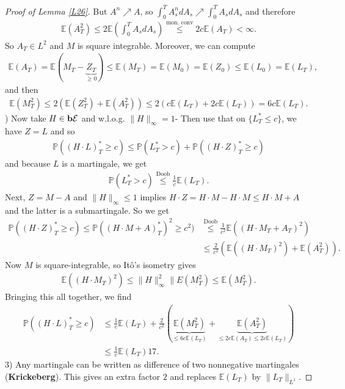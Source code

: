 \documentclass[12pt,a4paper, twoside]{article}
\theoremstyle{definition}
\newcommand{\EE}{\mathbb{E}} %
\newcommand{\PP}{\mathbb{P}} %
\newcommand{\simple}{\textbf{\text{b}}\mathcal{E}}
\begin{document}
\begin{proof}[Proof of Lemma \ref{L26}]
But $A^n \nearrow A$, so $\int_0^T A_s^n dA_s \nearrow \int_0^T A_s dA_s$ and therefore 
\begin{align*}
\EE(A_T^2) \leq 2 \EE \left( \int_0^T A_s d A_s \right) \overset{\text{mon. conv}}\leq 2c \EE(A_T) < \infty.
\end{align*}
So $A_T \in L^2$ and $M$ is square integrable. Moreover, we can compute 
\begin{align*}
\EE(A_T)= \EE(M_T-\underbrace{Z_T}_{ \geq 0}) \leq \EE(M_T)=\EE(M_0) = \EE(Z_0) \leq \EE(L_0)= \EE(L_T),
\end{align*}
and then 
\begin{align*}
\EE(M_T^2) \leq 2( \EE(Z_T^2) + \EE(A_T^2)) \leq 2(c \EE(L_T)+2c \EE(L_T)) = 6c \EE(L_T).
\end{align*}
\newpage
{}) Now take $H \in \simple$ and w.l.o.g. $\|H\|_\infty =1$- Then use that on $\{ L_T^* \leq c\}$, we have $Z=L$ and so 
\begin{align*}
\PP((H \cdot L)_T^* \geq c) \leq \PP(L_T^* > c) + \PP( ( H \cdot Z)_T^* \geq c)
\end{align*}
and because $L$ is a martingale, we get 
\begin{align*}
\PP(L_T^* >c) \overset{\text{Doob}}\leq \frac{1}{c} \EE(L_T).
\end{align*}
Next, $Z=M-A$ and $\|H\|_\infty \leq 1$ implies $H \cdot Z = H \cdot M - H \cdot M \leq H \cdot M + A$ and the latter is a submartingale. So we get
\begin{align*}
\PP((H \cdot Z)_T^* \geq c) \leq \PP((H \cdot M + A)_T^*)^2  \geq c^2 ) &\overset{\text{Doob}}\leq \frac{1}{c^2} \EE((H \cdot M_T + A_T)^2)  \\
&\leq \frac{2}{c^2} ( \EE((H \cdot M_T)^2 ) + \EE(A_T^2)). 
\end{align*}
Now $M$ is square-integrable, so Itô's isometry gives 
\begin{align*}
\EE(( H \cdot M_T)^2 ) \leq \|H\|_\infty^2 \|E(M_T^2) \leq \EE (M_T^2). 
\end{align*}
Bringing this all together, we find
\begin{align*}
\PP((H \cdot L)_T^* \geq c)& \leq \frac{1}{c} \EE(L_T) + \frac{2}{c^2}( \underbrace{\EE(M_T^2)}_{ \leq 6c \EE(L_T)} + \underbrace{\EE(A_T^2)}_{\leq 2c \EE(A_T) \leq 2c \EE(L_T)}) \\
& \leq \frac{1}{c} \EE(L_T)17.
\end{align*}
3) Any martingale can be written as difference of two nonnegative martingales (\textbf{Krickeberg}). This gives an extra factor $2$ and replaces $\EE(L_T)$ by $\|L_T\|_{L^1}$. 
\end{proof}
\newpage
\end{document}
